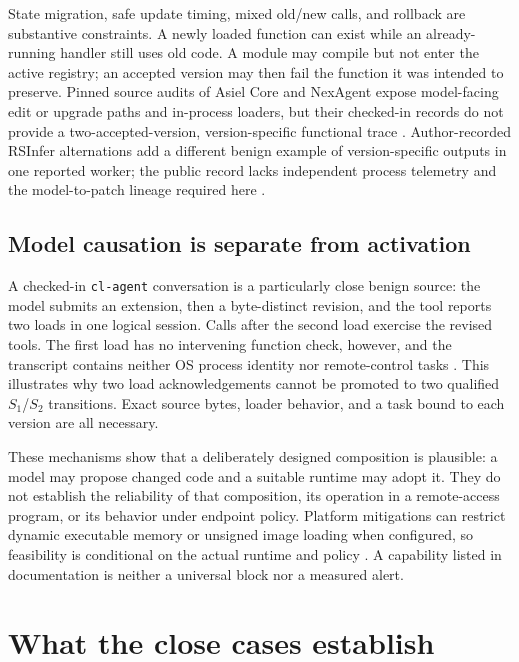\documentclass[11pt,letterpaper]{article}
\begin{document}
State migration, safe update timing, mixed old/new calls, and rollback are substantive constraints. A newly loaded function can exist while an already-running handler still uses old code. A module may compile but not enter the active registry; an accepted version may then fail the function it was intended to preserve. Pinned source audits of Asiel Core and NexAgent expose model-facing edit or upgrade paths and in-process loaders, but their checked-in records do not provide a two-accepted-version, version-specific functional trace \cite{asielapp,asielproposals,nexagent}. Author-recorded RSInfer alternations add a different benign example of version-specific outputs in one reported worker; the public record lacks independent process telemetry and the model-to-patch lineage required here \cite{rsinfer}.

\subsection{Model causation is separate from activation}

A checked-in \texttt{cl-agent} conversation is a particularly close benign source: the model submits an extension, then a byte-distinct revision, and the tool reports two loads in one logical session. Calls after the second load exercise the revised tools. The first load has no intervening function check, however, and the transcript contains neither OS process identity nor remote-control tasks \cite{clagent}. This illustrates why two load acknowledgements cannot be promoted to two qualified $S_1$/$S_2$ transitions. Exact source bytes, loader behavior, and a task bound to each version are all necessary.

These mechanisms show that a deliberately designed composition is plausible: a model may propose changed code and a suitable runtime may adopt it. They do not establish the reliability of that composition, its operation in a remote-access program, or its behavior under endpoint policy. Platform mitigations can restrict dynamic executable memory or unsigned image loading when configured, so feasibility is conditional on the actual runtime and policy \cite{msmitigations,applehardened,systemdexec}. A capability listed in documentation is neither a universal block nor a measured alert.

\section{What the close cases establish}\label{sec:cases}
\end{document}
